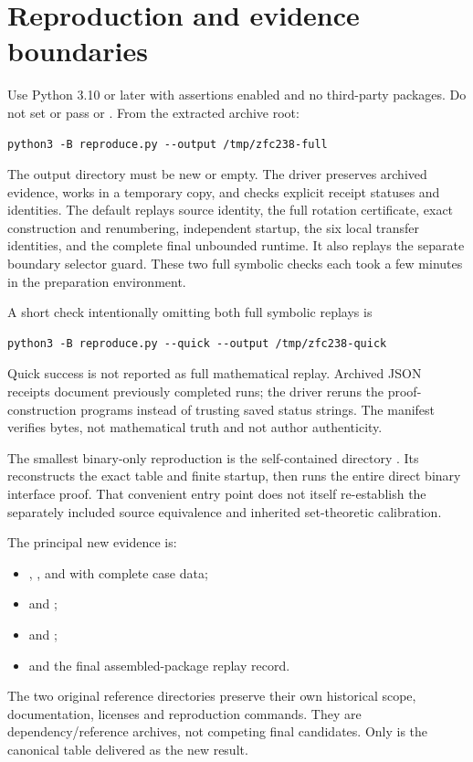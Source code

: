 \section{Reproduction and evidence boundaries}
Use Python 3.10 or later with assertions enabled and no third-party packages. Do not set  or pass  or . From the extracted archive root:
\begin{lstlisting}
python3 -B reproduce.py --output /tmp/zfc238-full
\end{lstlisting}
The output directory must be new or empty. The driver preserves archived evidence, works in a temporary copy, and checks explicit receipt statuses and identities. The default replays source identity, the full rotation certificate, exact construction and renumbering, independent startup, the six local transfer identities, and the complete final unbounded runtime. It also replays the separate boundary selector guard. These two full symbolic checks each took a few minutes in the preparation environment.

A short check intentionally omitting both full symbolic replays is
\begin{lstlisting}
python3 -B reproduce.py --quick --output /tmp/zfc238-quick
\end{lstlisting}
Quick success is not reported as full mathematical replay. Archived JSON receipts document previously completed runs; the driver reruns the proof-construction programs instead of trusting saved status strings. The manifest verifies bytes, not mathematical truth and not author authenticity.

The smallest binary-only reproduction is the self-contained directory . Its  reconstructs the exact table and finite startup, then runs the entire direct binary interface proof. That convenient entry point does not itself re-establish the separately included source equivalence and inherited set-theoretic calibration.

The principal new evidence is:
\begin{itemize}
\item {}, , and  with complete case data;
\item {} and ;
\item {} and ;
\item {} and the final assembled-package replay record.
\end{itemize}
The two original reference directories preserve their own historical scope, documentation, licenses and reproduction commands. They are dependency/reference archives, not competing final candidates. Only  is the canonical table delivered as the new result.

